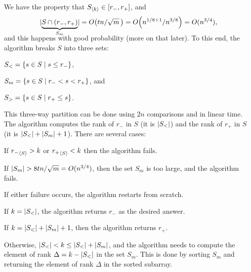 We have the property that
$S_{\langle k\rangle} \in [r_{-}, r_{+}]$, and
\begin{equation*}
    \cardin{ \smash{\underbrace{S \cap (r_{-}, r_{+})}_{S_m}} }%
    =%
    O\bigl(tn /\sqrt{m}\,\bigr)%
    =%
    O\pth{ n^{1/8+ 1}  / n^{3/8}}%
    =%
    O(n^{3/4}),
\end{equation*} %
and this happens with good probability (more on that later).
To this end, the algorithm breaks $S$ into three sets:
\begin{compactenumi}
    \smallskip%
    \item $S_< = \left\{  s \in S \;\middle\vert\; s \leq r_{-} \right\}$,
    \smallskip%
    \item $S_m = \left\{  s \in S \;\middle\vert\; r_{-} < s < r_{+} \right\}$, and
    \smallskip%
    \item $S_> = \left\{  s \in S \;\middle\vert\;  r_{+} \leq s \right\}$.
\end{compactenumi}%
\medskip%
This three-way partition can be done using $2n$ comparisons and in linear
time.  The algorithm computes the rank of $r_-$ in $S$ (it is
$\left| {S_<} \right|$) and the rank of $r_{+}$ in $S$ (it is
$\left| {S_<} \right| + \left| {S_m} \right| + 1$). There are several cases: \smallskip%
\begin{compactitem}
    \item If ${r_{-}}_{ \left\langle { S} \right\rangle} > k$ or ${r_{+}}_{ \left\langle {S} \right\rangle} < k $ then the
    algorithm fails.

    \item If $\left| {S_m} \right| > 8 t {n}/ \sqrt{m} = O(n^{3/4})$, then the
    set $S_m$ is too large, and the algorithm fails.
\end{compactitem}
\medskip%
If either failure occurs, the algorithm restarts from scratch.
\begin{compactitem}
    \smallskip%
    \item If $k = \left| {S_<} \right|$, the algorithm returns $r_-$ as the
    desired answer.

    \smallskip%
    \item If $k = \left| {S_<} \right| + \left| {S_m} \right| + 1$, then the algorithm
    returns $r_+$.

    \smallskip%
    \item Otherwise, $\left| {S_<} \right| < k \leq \left| {S_<} \right| + \left| {S_m} \right|$,
    and the algorithm needs to compute the element of rank
    $\Delta = k - \left| {S_<} \right|$ in the set $S_m$. This is done by sorting
    $S_m$ and returning the element of rank $\Delta$ in the sorted
    subarray.
\end{compactitem}

